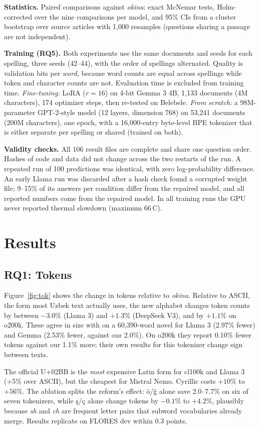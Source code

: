 \textbf{Statistics.} Paired comparisons against \emph{okina}: exact McNemar tests, Holm-corrected over the nine comparisons per model, and 95\% CIs from a cluster bootstrap over source articles with 1{,}000 resamples (questions sharing a passage are not independent).

\textbf{Training (RQ5).} Both experiments use the same documents and seeds for each spelling, three seeds (42--44), with the order of spellings alternated. Quality is validation bits per \emph{word}, because word counts are equal across spellings while token and character counts are not. Evaluation time is excluded from training time. \emph{Fine-tuning:} LoRA ($r=16$) on 4-bit Gemma 3 4B, 1{,}133 documents (4M characters), 174 optimizer steps, then re-tested on Belebele. \emph{From scratch:} a 98M-parameter GPT-2-style model (12 layers, dimension 768) on 53{,}241 documents (200M characters), one epoch, with a 16{,}000-entry byte-level BPE tokenizer that is either separate per spelling or shared (trained on both).

\textbf{Validity checks.} All 106 result files are complete and share one question order. Hashes of code and data did not change across the two restarts of the run. A repeated run of 100 predictions was identical, with zero log-probability difference. An early Llama run was discarded after a hash check found a corrupted weight file; 9--15\% of its answers per condition differ from the repaired model, and all reported numbers come from the repaired model. In all training runs the GPU never reported thermal slowdown (maximum 66\,\textdegree{}C).

\section{Results}
\subsection{RQ1: Tokens}
Figure~\ref{fig:tok} shows the change in tokens relative to \emph{okina}. Relative to ASCII, the form most Uzbek text actually uses, the new alphabet changes token counts by between $-3.0\%$ (Llama 3) and $+1.3\%$ (DeepSeek V3), and by $+1.1\%$ on o200k. These agree in size with \citet{rozimatov2026} on a 60{,}390-word novel for Llama 3 (2.97\% fewer) and Gemma (2.53\% fewer, against our 2.0\%). On o200k they report 0.10\% fewer tokens against our 1.1\% more; their own results for this tokenizer change sign between texts.

The official U+02BB is the \emph{most} expensive Latin form for cl100k and Llama 3 (+5\% over ASCII), but the cheapest for Mistral Nemo. Cyrillic costs $+10\%$ to $+56\%$. The ablation splits the reform's effect: \"o/\u{g} alone save 2.0--7.7\% on six of seven tokenizers, while \c{s}/\c{c} alone change tokens by $-0.1\%$ to $+4.2\%$, plausibly because \emph{sh} and \emph{ch} are frequent letter pairs that subword vocabularies already merge. Results replicate on FLORES dev within 0.3 points.

